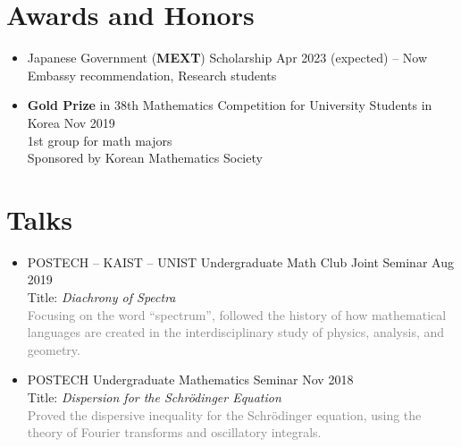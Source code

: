 \documentclass[11pt,a4paper]{article}
\begin{document}
\section*{Awards and Honors}
\begin{itemize}
\item
	Japanese Government (\textbf{MEXT}) Scholarship
	\hfill{\small Apr 2023 (expected) -- Now}\\
	Embassy recommendation, Research students
\item
	\textbf{Gold Prize} in 38th Mathematics Competition for University Students in Korea
	\hfill{\small Nov 2019}\\
	1st group for math majors\\
	Sponsored by Korean Mathematics Society
\end{itemize}




\section*{Talks}
\begin{itemize}
\item
	POSTECH -- KAIST -- UNIST Undergraduate Math Club Joint Seminar
	\hfill{\small Aug 2019}\\
	Title: \emph{Diachrony of Spectra}\\
	\textcolor{gray}{Focusing on the word ``spectrum'', followed the history of how mathematical languages are created in the interdisciplinary study of physics, analysis, and geometry.}
\item
	POSTECH Undergraduate Mathematics Seminar
	\hfill{\small Nov 2018}\\
	Title: \emph{Dispersion for the Schr\"odinger Equation}\\
	\textcolor{gray}{Proved the dispersive inequality for the Schr\"odinger equation, using the theory of Fourier transforms and oscillatory integrals.}
\end{itemize}
\end{document}

